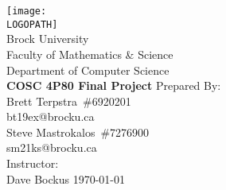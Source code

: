 \documentclass[12pt,a4paper]{report}
\makeatletter
\def \LOGOPATH {assets/brock.jpg}
\def \UNIVERSITY {Brock University}
\def \FACULTY {Faculty of Mathematics \& Science}
\def \DEPARTEMENT {Department of Computer Science}
\def \PROJECTTITLE {COSC 4P80 Final Project}
\def \STUDENTA {Brett Terpstra}
\def \STUDENTB {Steve Mastrokalos}
\def \STUDENTNOA {6920201}
\def \STUDENTNOB {7276900}
\def \STUDENTEMAILA {bt19ex@brocku.ca}
\def \STUDENTEMAILB {sm21ks@brocku.ca}
\def \SUPERVISOR {Dave Bockus}
\makeatother
\begin{document}
	\setlength{\parindent}{0em}
	\setlength{\parskip}{0.5em}
	
	
	
	\begin{titlepage}
		\vfill
		\begin{center}
			\texttt{[image: \\LOGOPATH]} \\
			\fontsize{14pt}{14pt}\selectfont
			\vfill
			\UNIVERSITY \\
			\FACULTY \\
			\DEPARTEMENT \\
			\vfill
			\fontsize{18pt}{18pt}\selectfont
			\textbf{\PROJECTTITLE}
			\vfill
			\fontsize{14pt}{14pt}\selectfont
			Prepared By: \\
			\STUDENTA \ \#\STUDENTNOA \\
			\STUDENTEMAILA \\
			\vfill
			\STUDENTB \ \#\STUDENTNOB \\
			\STUDENTEMAILB \\
			\vfill
			Instructor: \\
			\SUPERVISOR
			\vfill
			\vfill
			\vfill
			\monthyeardate\today
		\end{center}
	\end{titlepage}
	
	

	\cleardoublepage {} {}
	\tableofcontents
	
	\cleardoublepage
	
	\setlength{\parindent}{0em}
	\setlength{\parskip}{0.5em}
	
	
	
	
	
	
	
\end{document}
